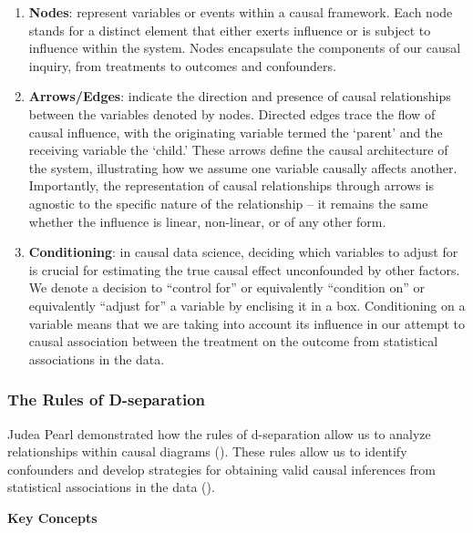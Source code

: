 \documentclass[
  singlecolumn]{article}
\begin{document}
\begin{enumerate}
\def\labelenumi{\arabic{enumi}.}
\item
  \textbf{Nodes}: represent variables or events within a causal
  framework. Each node stands for a distinct element that either exerts
  influence or is subject to influence within the system. Nodes
  encapsulate the components of our causal inquiry, from treatments to
  outcomes and confounders.
\item
  \textbf{Arrows/Edges}: indicate the direction and presence of causal
  relationships between the variables denoted by nodes. Directed edges
  trace the flow of causal influence, with the originating variable
  termed the `parent' and the receiving variable the `child.' These
  arrows define the causal architecture of the system, illustrating how
  we assume one variable causally affects another. Importantly, the
  representation of causal relationships through arrows is agnostic to
  the specific nature of the relationship -- it remains the same whether
  the influence is linear, non-linear, or of any other form.
\item
  \textbf{Conditioning}: in causal data science, deciding which
  variables to adjust for is crucial for estimating the true causal
  effect unconfounded by other factors. We denote a decision to
  ``control for'' or equivalently ``condition on'' or equivalently
  ``adjust for'' a variable by enclising it in a box. Conditioning on a
  variable means that we are taking into account its influence in our
  attempt to causal association between the treatment on the outcome
  from statistical associations in the data.
\end{enumerate}

\subsubsection{The Rules of
D-separation}\label{the-rules-of-d-separation}

Judea Pearl demonstrated how the rules of d-separation allow us to
analyze relationships within causal diagrams
(). These rules allow us to identify
confounders and develop strategies for obtaining valid causal inferences
from statistical associations in the data
().

\textbf{Key Concepts}
\end{document}
